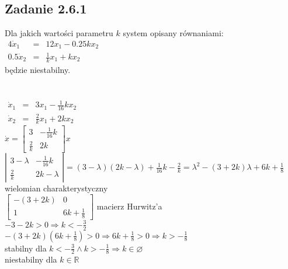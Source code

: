 \subsection*{Zadanie 2.6.1} {\color{darkgray}
	Dla jakich wartości parametru $k$ system opisany równaniami:\\
	$\begin{array}{rcl}4\dot{x}_1&=&12x_1-0.25kx_2  \\  0.5\dot{x}_2&=&\frac 1kx_1+kx_2\end{array}$\\
	będzie niestabilny.\\
}\lineh
\\\\
$\begin{array}{rcl}\dot{x}_1&=&3x_1-\frac{1}{16}kx_2  \\  \dot{x}_2&=&\frac 2kx_1+2kx_2\end{array}$\\
$\dot{x}=\left[\begin{array}{cc}3&-\frac{1}{16}k\\\frac{2}{k}&2k\end{array}\right]x$\\
$\left|\begin{array}{cc}3-\lambda&-\frac{1}{16}k\\\frac{2}{k}&2k-\lambda\end{array}\right|=(3-\lambda)(2k-\lambda)+\frac{1}{16}k-\frac{2}{k}=\lambda^2-(3+2k)\lambda+6k+\frac{1}{8}$ wielomian charakterystyczny\\
$\left[\begin{array}{cc}-(3+2k) &0\\1&6k+\frac 18\end{array}\right]$ macierz Hurwitz'a\\
$-3-2k>0\Rightarrow k<-\frac 32$\\
$-(3+2k)(6k+\frac 18)>0 \Rightarrow 6k+\frac 18>0\Rightarrow k>-\frac 18$\\
stabilny dla $k<-\frac 32 \wedge k>-\frac 18 \Rightarrow k\in \varnothing$\\
niestabilny dla $k \in \mathbb{R}$




\pagebreak

